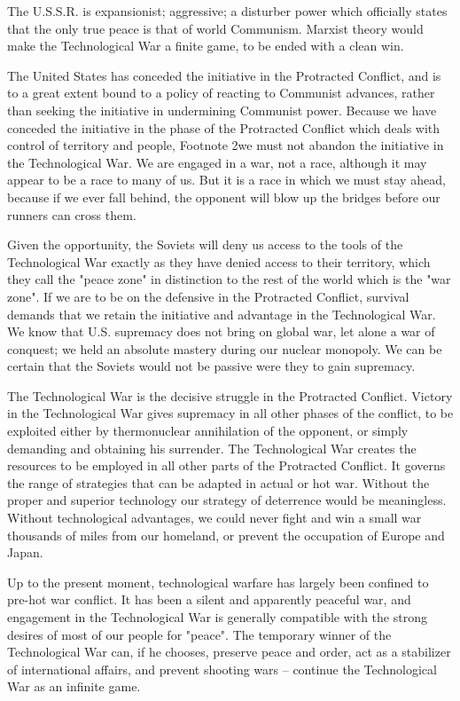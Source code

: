 \documentclass[a4paper,12pt]{book}
\begin{document}
The U.S.S.R. is expansionist; aggressive; a disturber power which officially states that the only true peace is that of world Communism. Marxist theory would make the Technological War a finite game, to be ended with a clean win.

The United States has conceded the initiative in the Protracted Conflict, and is to a great extent bound to a policy of reacting to Communist advances, rather than seeking the initiative in undermining Communist power. Because we have conceded the initiative in the phase of the Protracted Conflict which deals with control of territory and people, Footnote 2we must not abandon the initiative in the Technological War. We are engaged in a war, not a race, although it may appear to be a race to many of us. But it is a race in which we must stay ahead, because if we ever fall  behind, the opponent will blow up the bridges before our runners can cross them.

Given the opportunity, the Soviets will deny us access to the tools of the Technological War exactly as they have denied access to their territory, which they call the "peace zone" in distinction to the rest of the world which is the "war zone". If we are to be on the defensive in the Protracted Conflict, survival demands that we retain the initiative and advantage in the Technological War. We know that U.S. supremacy does not bring on global war, let alone a war of conquest; we held an absolute mastery during our nuclear monopoly. We can be certain that the Soviets would not be passive were they to gain supremacy.

The Technological War is the decisive struggle in the Protracted Conflict. Victory in the Technological War gives supremacy in all other phases of the conflict, to be exploited either by thermonuclear annihilation of the opponent, or simply demanding and obtaining his surrender. The Technological War creates the resources to be employed in all other parts of the Protracted Conflict. It governs the range of strategies that can be adapted in actual or hot war. Without the proper and superior technology our strategy of deterrence would be meaningless. Without technological advantages, we could never fight and win a small war thousands of miles from our homeland, or prevent the occupation of Europe and Japan.

Up to the present moment, technological warfare has largely been confined to pre-hot war conflict. It has been a silent and apparently peaceful war, and engagement in the Technological War is generally compatible with the strong desires of most of our people for "peace". The temporary winner of the Technological War can, if he chooses, preserve peace and order, act as a stabilizer of international affairs, and prevent shooting wars -- continue the Technological War as an infinite game.
\end{document}
